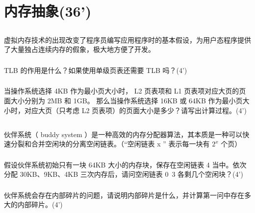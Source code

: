 \documentclass[a4paper,12pt]{article}
\newcommand{\score}[1]{(#1')}
\begin{document}
\section{内存抽象\score{36}}

\subsection{}

虚拟内存技术的出现改变了程序员编写应用程序时的基本假设，为用户态程序提供了大量独占连续内存的假象，极大地方便了开发。

\subsubsection{}

TLB 的作用是什么？如果使用单级页表还需要 TLB 吗？\score{4}

\subsubsection{}

当操作系统选择 4KB 作为最小页大小时， L2 页表项和 L1 页表项对应大页的页面大小分别为 2MB 和 1GB。
那么当操作系统选择 16KB 或 64KB 作为最小页大小时，对应大页（只考虑 L2 页表项）的页面大小是多少？请写出计算过程。\score{4}


\subsection{}

伙伴系统（ buddy system ）是一种高效的内存分配器算法，其本质是一种可以快速分裂和合并空闲块的分离空闲链表。（“空闲链表 x ” 表示每一块有 $2^{x}$ 个页）

\subsubsection{}

假设伙伴系统初始只有一块 64KB 大小的内存块，保存在空闲链表 4 当中。依次分配 30KB、9KB、4KB 三次内存后，请问空闲链表 0~3 各剩几个空闲块？\score{4}

\subsubsection{}

伙伴系统会存在内部碎片的问题，请说明内部碎片是什么，并计算第一问中存在多大的内部碎片。\score{4}


\subsection{}
\end{document}
